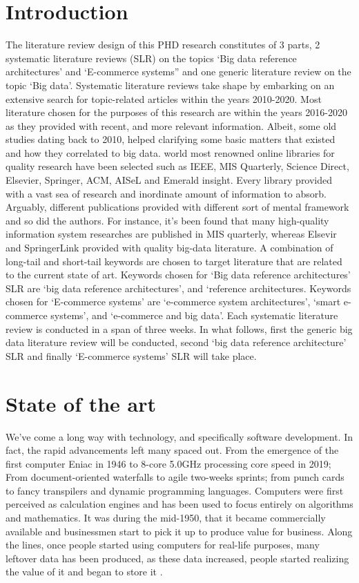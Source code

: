  \label{chap:litrev}

\section{Introduction}\label{sec:Introduction}

The literature review design of this PHD research constitutes of 3 parts, 2 systematic literature reviews (SLR) on the topics ‘Big data reference architectures’ and ‘E-commerce systems” and one generic literature review on the topic ‘Big data’.
Systematic literature reviews take shape by embarking on an extensive search for topic-related articles within the years 2010-2020. Most literature chosen for the purposes of this research are within the years 2016-2020 as they provided with recent, and more relevant information. Albeit, some old studies dating back to 2010, helped clarifying some basic matters that existed and how they correlated to big data. world most renowned online libraries for quality research have been selected such as IEEE, MIS Quarterly, Science Direct, Elsevier, Springer, ACM, AISeL and Emerald insight. Every library provided with a vast sea of research and inordinate amount of information to absorb. Arguably, different publications provided with different sort of mental framework and so did the authors. For instance, it’s been found that many high-quality information system researches are published in MIS quarterly, whereas Elsevir and SpringerLink provided with quality big-data literature. A combination of long-tail and short-tail keywords are chosen to target literature that are related to the current state of art. Keywords chosen for ‘Big data reference architectures’ SLR are ‘big data reference architectures’, and ‘reference architectures. Keywords chosen for ‘E-commerce systems’ are ‘e-commerce system architectures’, ‘smart e-commerce systems’, and ‘e-commerce and big data’. Each systematic literature review is conducted in a span of three weeks.
In what follows, first the generic big data literature review will be conducted, second ‘big data reference architecture’ SLR and finally ‘E-commerce systems’ SLR will take place.

\section{State of the art}\label{sec:Introduction}

We’ve come a long way with technology, and specifically software development. In fact, the rapid advancements left many spaced out. From the emergence of the first computer Eniac in 1946 to 8-core 5.0GHz processing core speed in 2019; From document-oriented waterfalls to agile two-weeks sprints; from punch cards to fancy transpilers  and dynamic programming languages.  Computers were first perceived as calculation engines and has been used to focus entirely on algorithms and mathematics. It was during the mid-1950, that it became commercially available and businessmen start to pick it up to produce value for business. Along the lines, once people started using computers for real-life purposes, many leftover data has been produced, as these data increased, people started realizing the value of it and began to store it \cite{Grad2009}.

